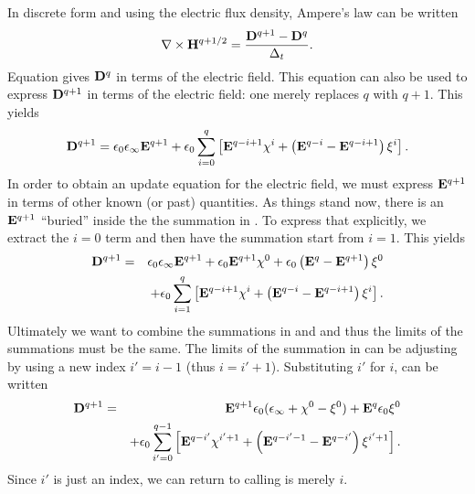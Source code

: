 In discrete form and using the electric flux density, Ampere's law can
be written
\begin{equation}
  \nabla\times\mathbf{H}^{q+1/2} = \frac{\mathbf{D}^{q+1} - \mathbf{D}^{q}}{\Delta_t}.
  \label{eq:plrcAmpere}
\end{equation}
Equation  gives $\mathbf{D}^{q}$ in terms of the electric
field.  This equation can also be used to express $\mathbf{D}^{q+1}$ in
terms of the electric field: one merely replaces $q$ with $q+1$.  This
yields
\begin{equation}
  \mathbf{D}^{q+1} = \epsilon_0\epsilon_\infty\mathbf{E}^{q+1} + 
    \epsilon_0\sum_{i=0}^{q}\left[
    \mathbf{E}^{q-i+1} \chi^i
    + \left(\mathbf{E}^{q-i}-\mathbf{E}^{q-i+1}\right)\xi^i\right].
  \label{eq:plrcDqI}
\end{equation}
In order to obtain an update equation for the electric field, we must
express $\mathbf{E}^{q+1}$ in terms of other known (or past) quantities.
As things stand now, there is an $\mathbf{E}^{q+1}$ ``buried'' inside the
the summation in .  To express that explicitly, we
extract the $i=0$ term and then have the summation start from $i=1$.
This yields
\begin{eqnarray}
  \mathbf{D}^{q+1} &=& \epsilon_0\epsilon_\infty\mathbf{E}^{q+1} + 
    \epsilon_0 \mathbf{E}^{q+1} \chi^0 + \epsilon_0
    \left(\mathbf{E}^{q}-\mathbf{E}^{q+1}\right)\xi^0 \nonumber\\
 && +
    \epsilon_0\sum_{i=1}^{q}\left[
    \mathbf{E}^{q-i+1} \chi^i
    + \left(\mathbf{E}^{q-i}-\mathbf{E}^{q-i+1}\right)\xi^i\right].
  \label{eq:plrcDqII}
\end{eqnarray}
Ultimately we want to combine the summations in  and
 and thus the limits of the summations must be the
same.  The limits of the summation in  can be
adjusting by using a new index $i'=i-1$ (thus $i=i'+1$).  Substituting
$i'$ for $i$,  can be written
\begin{eqnarray}
  \mathbf{D}^{q+1} &=& 
    \mathbf{E}^{q+1} 
     \epsilon_0(\epsilon_\infty + \chi^0 - \xi^0)
     + \mathbf{E}^q \epsilon_0 \xi^0 \nonumber\\
  && +
    \epsilon_0\sum_{i'=0}^{q-1}\left[
    \mathbf{E}^{q-i'} \chi^{i'+1}
    + \left(\mathbf{E}^{q-i'-1}-\mathbf{E}^{q-i'}\right)\xi^{i'+1}\right].
  \label{eq:plrcDqIII}
\end{eqnarray}
Since $i'$ is just an index, we can return to calling is merely $i$.

